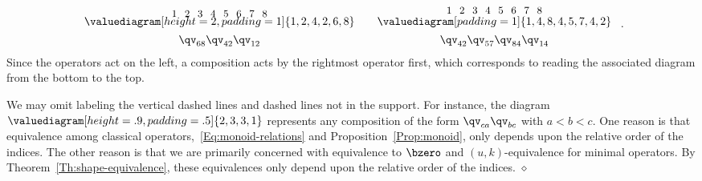 \newcommand{\llabelhack}{\begin{picture}(85,2)
   \put(0 ,-4){{\small 1}}\put(11.5,-4){{\small 2}}
   \put(23,-4){{\small 3}}\put(34.5,-4){{\small 4}}
   \put(46,-4){{\small 5}}\put(57.5,-4){{\small 6}}
   \put(69,-4){{\small 7}}\put(80.5,-4){{\small 8}}\end{picture}}

\[
    \begin{array}{c@{\qquad}c}
    \raisebox{-1pt}{\llabelhack} & \raisebox{2pt}{\llabelhack} \\
     \valuediagram[height=2, padding=1]{{1,2},{4,2},{6,8}}
    &
     \valuediagram[padding=1]{{1,4},{8,4},{5,7},{4,2}}
     \\[1ex]
    \qv_{68}\qv_{42}\qv_{12} & \qv_{42}\qv_{57}\qv_{84}\qv_{14}
  \end{array}\ .
\]
Since the operators act on the left, a composition acts by the rightmost
operator first, which corresponds to reading the associated diagram from the
bottom to the top.


\begin{remark}\label{Rem:relative-labels}
  We may omit labeling the vertical dashed lines and dashed lines not in the support.
  For instance, the diagram $\valuediagram[height=.9, padding=.5]{{2,3},{3,1}}$
  represents any composition of the form ${\qv}_{ca} {\qv}_{bc} $ with $a<b<c$.
  One reason is that equivalence among classical operators,~\eqref{Eq:monoid-relations} and
  Proposition~\ref{Prop:monoid}, only depends upon the relative order of the indices.
  The other reason is that we are primarily concerned with equivalence to $\bzero$ and $(u,k)$-equivalence for minimal operators.
  By Theorem~\ref{Th:shape-equivalence}, these equivalences only depend upon the relative order of the indices.
 \hfill$\diamond$
\end{remark}

